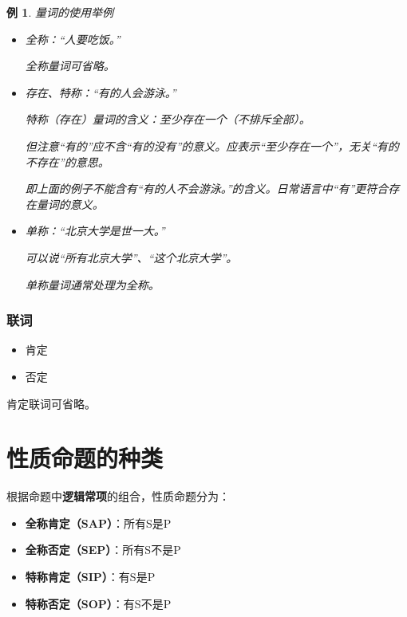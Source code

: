 \documentclass[12pt,onecolumn,a4paper]{book}
\newtheorem*{example}{例}
\numberwithin{table}{subsection}
\numberwithin{equation}{subsection}
\begin{document}
\begin{example}
    量词的使用举例
    \begin{itemize}[itemsep=0pt,parsep=0pt]
        \item 全称：“人要吃饭。”
        
        \emph{全称量词可省略。}
        \item 存在、特称：“有的人会游泳。”
        
        \emph{特称（存在）量词的含义：至少存在一个（不排斥全部）}。

        但注意“有的”应不含“有的没有”的意义。应表示“至少存在一个”，无关“有的不存在”的意思。

        即上面的例子不能含有“有的人不会游泳。”的含义。日常语言中“有”更符合存在量词的意义。
        \item 单称：“北京大学是世一大。”
        
        可以说“所有北京大学”、“这个北京大学”。

        \emph{单称量词通常处理为全称。}
    \end{itemize}
\end{example}

\subsubsection{联词}

\begin{itemize}[itemsep=0pt,parsep=0pt]
    \item 肯定
    \item 否定
\end{itemize}

肯定联词可省略。

\section{性质命题的种类}

根据命题中\textbf{逻辑常项}的组合，性质命题分为：

\begin{itemize}[itemsep=0pt,parsep=0pt]
    \item \textbf{全称肯定（SAP）}：所有S是P
    \item \textbf{全称否定（SEP）}：所有S不是P
    \item \textbf{特称肯定（SIP）}：有S是P
    \item \textbf{特称否定（SOP）}：有S不是P
\end{itemize}
\end{document}
